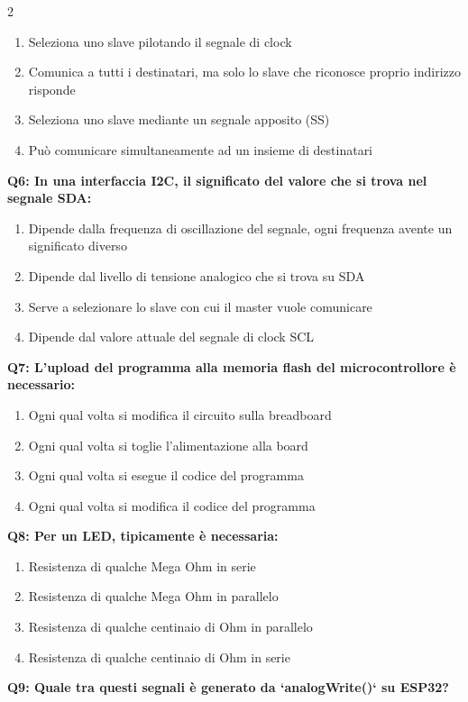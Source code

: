 \documentclass[10pt]{article}
\begin{document}
\begin{multicols}{2}
\begin{enumerate}[label=\arabic*.]
\item Seleziona uno slave pilotando il segnale di clock
\item Comunica a tutti i destinatari, ma solo lo slave che riconosce proprio indirizzo risponde
\item Seleziona uno slave mediante un segnale apposito (SS)
\item Può comunicare simultaneamente ad un insieme di destinatari
\end{enumerate}
\textbf{Q6: In una interfaccia I2C, il significato del valore che si trova nel segnale SDA:}

\begin{enumerate}[label=\arabic*.]
\item Dipende dalla frequenza di oscillazione del segnale, ogni frequenza avente un significato diverso
\item Dipende dal livello di tensione analogico che si trova su SDA
\item Serve a selezionare lo slave con cui il master vuole comunicare
\item Dipende dal valore attuale del segnale di clock SCL
\end{enumerate}
\textbf{Q7: L'upload del programma alla memoria flash del microcontrollore è necessario:}

\begin{enumerate}[label=\arabic*.]
\item Ogni qual volta si modifica il circuito sulla breadboard
\item Ogni qual volta si toglie l'alimentazione alla board
\item Ogni qual volta si esegue il codice del programma
\item Ogni qual volta si modifica il codice del programma
\end{enumerate}
\textbf{Q8: Per un LED, tipicamente è necessaria:}

\begin{enumerate}[label=\arabic*.]
\item Resistenza di qualche Mega Ohm in serie
\item Resistenza di qualche Mega Ohm in parallelo
\item Resistenza di qualche centinaio di Ohm in parallelo
\item Resistenza di qualche centinaio di Ohm in serie
\end{enumerate}
\textbf{Q9: Quale tra questi segnali è generato da `analogWrite()` su ESP32?}


\end{multicols}
\end{document}
